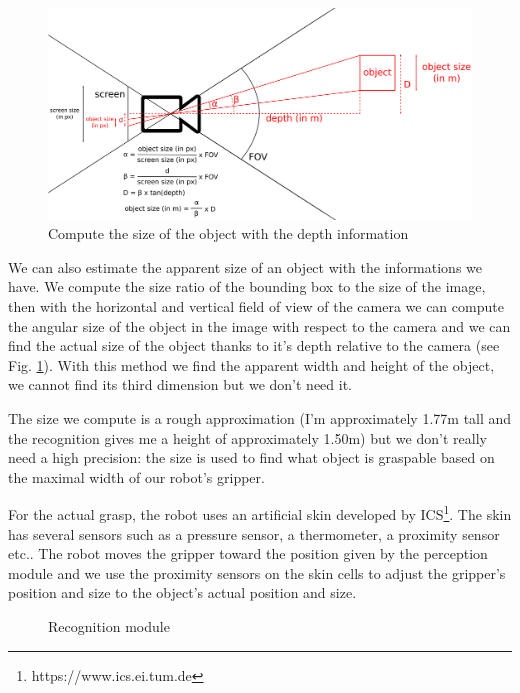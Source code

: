 \documentclass[a4paper, twocolumn]{article}
\begin{document}
    \begin{figure}[!b]
        \includegraphics[width=\textwidth]{../img/camera_size.jpg}
        \caption{Compute the size of the object with the depth information}
        \label{camera_size}
    \end{figure}

    We can also estimate the apparent size of an object with the informations we have. We compute the size ratio of the bounding box to the size of the image, then with the horizontal and vertical field of view of the camera we can compute the angular size of the object in the image with respect to the camera and we can find the actual size of the object thanks to it's depth relative to the camera (see Fig. \ref{camera_size}). With this method we find the apparent width and height of the object, we cannot find its third dimension but we don't need it.

    The size we compute is a rough approximation (I'm approximately 1.77m tall and the recognition gives me a height of approximately 1.50m) but we don't really need a high precision: the size is used to find what object is graspable based on the maximal width of our robot's gripper. 
    
    For the actual grasp, the robot uses an artificial skin \cite{hum} developed by ICS\footnote{https://www.ics.ei.tum.de}. The skin has several sensors such as a pressure sensor, a thermometer, a proximity sensor etc.. The robot moves the gripper toward the position given by the perception module and we use the proximity sensors on the skin cells to adjust the gripper's position and size to the object's actual position and size.
    
    \begin{figure}
        \resizebox{\textwidth}{!}{}
        \caption{Recognition module}
        \label{recognition_module}
    \end{figure}
\end{document}
